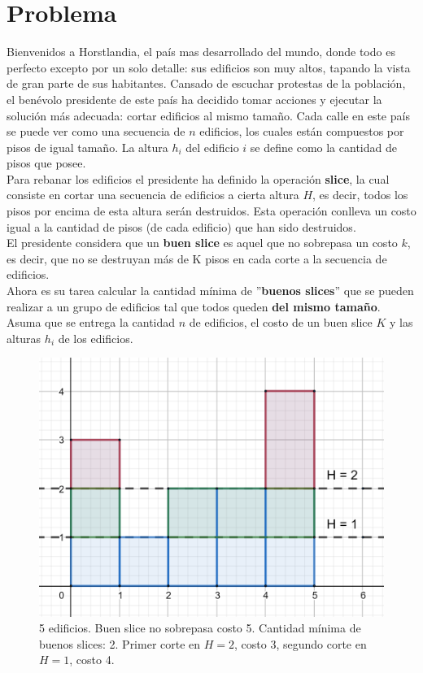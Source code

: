 \documentclass[spanish, fleqn]{article}
\title{Tarea \num\\
       \large Algoritmos y Complejidad\\[3ex]
       \emph{Slicing through the 90s}}
\author{Sassy Complexes}
\date{}
\begin{document}
\maketitle

\section{Problema}
Bienvenidos a Horstlandia, el país mas desarrollado del mundo, donde todo es perfecto excepto por un solo detalle: sus edificios son muy altos, tapando la vista de gran parte de sus habitantes. Cansado de escuchar protestas de la población, el benévolo presidente de este país ha decidido tomar acciones y ejecutar la solución más adecuada: cortar edificios al mismo tamaño. Cada calle en este país se puede ver como una secuencia de $n$ edificios, los cuales están compuestos por pisos de igual tamaño. La altura $h_i$ del edificio $i$ se define como la cantidad de pisos que posee.\\

Para rebanar los edificios el presidente ha definido la operación \textbf{slice}, la cual consiste en cortar una secuencia de edificios a cierta altura $H$, es decir, todos los pisos por encima de esta altura serán destruidos. Esta operación conlleva un costo igual a la cantidad de pisos (de cada edificio) que han sido destruidos.\\

El presidente considera que un \textbf{buen slice} es aquel que no sobrepasa un costo $k$, es decir, que no se destruyan más de K pisos en cada corte a la secuencia de edificios.\\

Ahora es su tarea calcular la cantidad mínima de ''\textbf{buenos slices}'' que se pueden realizar a un grupo de edificios tal que todos queden \textbf{del mismo tamaño}. Asuma que se entrega la cantidad $n$ de edificios, el costo de un buen slice $K$ y las alturas $h_i$ de los edificios.

\begin{figure}[ht]
    \centering
    \includegraphics[scale=0.5]{edificios.png}
    \caption{5 edificios. Buen slice no sobrepasa costo 5. Cantidad mínima de buenos slices: 2. Primer corte en $H=2$, costo 3, segundo corte en $H=1$, costo 4.}
    \label{fig:my_label}
\end{figure}
\end{document}
